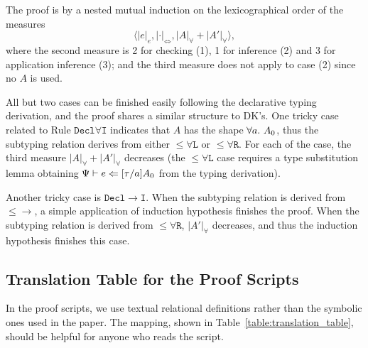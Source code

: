 The proof is by a nested mutual induction on the lexicographical order of the measures
$$\langle |e|_e, |\cdot|_\Leftrightarrow, |A|_\forall + |A'|_\forall \rangle,$$
where the second measure is 2 for checking (1), 1 for inference (2) and 3 for application inference (3);
and the third measure does not apply to case (2) since no $A$ is used.

All but two cases can be finished easily following the declarative typing derivation,
and the proof shares a similar structure to DK's.
One tricky case related to Rule $\mathtt{Decl\forall I}$ indicates that $A$ has the shape $\all A_0$,
thus the subtyping relation derives from either $\mathtt{{\le}\forall L}$ or $\mathtt{{\le}\forall R}$.
For each of the case, the third measure $|A|_\forall + |A'|_\forall$ decreases
(the $\mathtt{{\le}\forall L}$ case requires a type substitution lemma obtaining
$\Psi \vdash e \Leftarrow [\tau/a]A_0$ from the typing derivation).

Another tricky case is $\mathtt{Decl{\to}I}$.
When the subtyping relation is derived from $\mathtt{{\le}{\to}}$,
a simple application of induction hypothesis finishes the proof.
When the subtyping relation is derived from $\mathtt{{\le}\forall R}$,
$|A'|_\forall$ decreases, and thus the induction hypothesis finishes this case.

\subsection{Translation Table for the Proof Scripts}
In the proof scripts, we use textual relational definitions
rather than the symbolic ones used in the paper.
The mapping, shown in Table~\ref{table:translation_table}, should be helpful for anyone who reads the script.

